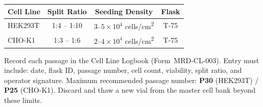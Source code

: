 
\vspace{4pt}
\begin{center}
\renewcommand{\arraystretch}{1.3}
\begin{tabular}{lccc}
\toprule
\rowcolor{ProtoTeal!15}
\textbf{Cell Line} & \textbf{Split Ratio} & \textbf{Seeding Density} & \textbf{Flask} \\
\midrule
HEK293T & 1:4 -- 1:10 & $3\text{--}5 \times 10^{4}$ cells/cm\textsuperscript{2} & T-75 \\
\rowcolor{ProtoGray}
CHO-K1  & 1:3 -- 1:6  & $2\text{--}4 \times 10^{4}$ cells/cm\textsuperscript{2} & T-75 \\
\bottomrule
\end{tabular}
\end{center}

\vspace{4pt}


\begin{tcolorbox}[infobox, title=\faBookOpen\enspace Passage Record]
  Record each passage in the Cell Line Logbook (Form~MRD-CL-003). Entry must include: date,
  flask ID, passage number, cell count, viability, split ratio, and operator signature. Maximum
  recommended passage number: \textbf{P30} (HEK293T) / \textbf{P25} (CHO-K1). Discard and
  thaw a new vial from the master cell bank beyond these limits.
\end{tcolorbox}
